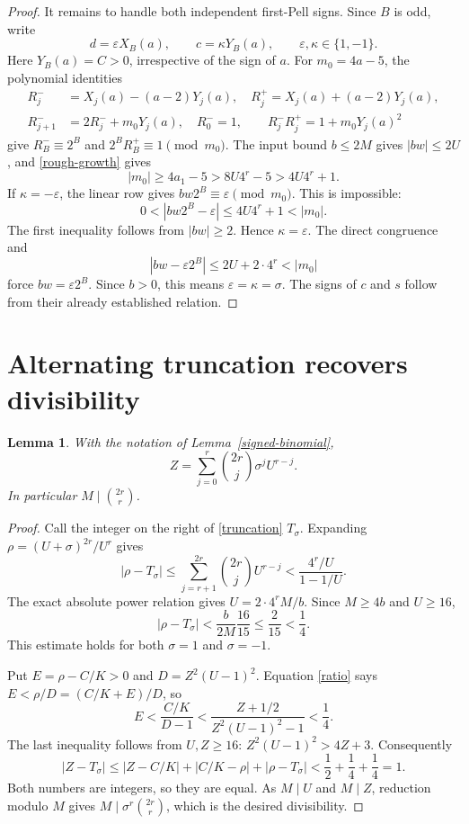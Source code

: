 \documentclass[11pt]{article}
\newtheorem{lemma}[theorem]{Lemma}
\begin{document}
\begin{proof}
It remains to handle both independent first-Pell signs. Since \(B\)
is odd, write
\[
              d=\varepsilon X_B(a),\qquad
              c=\kappa Y_B(a),\qquad
              \varepsilon,\kappa\in\{1,-1\}.
\]
Here \(Y_B(a)=C>0\), irrespective of the sign of \(a\).
For \(m_0=4a-5\), the polynomial identities
\[
 \begin{split}
 R_j^-&=X_j(a)-(a-2)Y_j(a),\quad
 R_j^+=X_j(a)+(a-2)Y_j(a),\\
 R_{j+1}^-&=2R_j^-+m_0Y_j(a),\quad R_0^-=1,\qquad
 R_j^-R_j^+=1+m_0Y_j(a)^2
 \end{split}
\]
give \(R_B^-\equiv2^B\) and \(2^BR_B^+\equiv1\pmod{m_0}\).
The input bound \(b\le2M\) gives \(|bw|\le2U\), and
\eqref{rough-growth} gives
\begin{equation}\label{m0-bound}
 |m_0|\ge4a_1-5>8U4^r-5>4U4^r+1.
\end{equation}
If \(\kappa=-\varepsilon\), the linear row gives
\(bw2^B\equiv\varepsilon\pmod{m_0}\). This is impossible:
\[
 0<|bw2^B-\varepsilon|\le4U4^r+1<|m_0|.
\]
The first inequality follows from \(|bw|\ge2\).
Hence \(\kappa=\varepsilon\). The direct congruence and
\[
 |bw-\varepsilon2^B|\le2U+2\cdot4^r<|m_0|
\]
force \(bw=\varepsilon2^B\). Since \(b>0\), this means
\(\varepsilon=\kappa=\sigma\). The signs of \(c\) and \(s\)
follow from their already established relation.
\end{proof}

\section{Alternating truncation recovers divisibility}

\begin{lemma}\label{rounding}
With the notation of Lemma~\ref{signed-binomial},
\begin{equation}\label{truncation}
 Z=\sum_{j=0}^r\binom{2r}{j}\sigma^jU^{r-j}.
\end{equation}
In particular \(M\mid\binom{2r}{r}\).
\end{lemma}
\begin{proof}
Call the integer on the right of \eqref{truncation} \(T_\sigma\).
Expanding \(\rho=(U+\sigma)^{2r}/U^r\) gives
\[
 |\rho-T_\sigma|
 \le\sum_{j=r+1}^{2r}\binom{2r}{j}U^{r-j}
 <\frac{4^r/U}{1-1/U}.
\]
The exact absolute power relation gives
\(U=2\cdot4^rM/b\). Since \(M\ge4b\) and \(U\ge16\),
\begin{equation}\label{tail}
 |\rho-T_\sigma|<\frac{b}{2M}\frac{16}{15}
 \le\frac{2}{15}<\frac14.
\end{equation}
This estimate holds for both \(\sigma=1\) and \(\sigma=-1\).

Put \(E=\rho-C/K>0\) and \(D=Z^2(U-1)^2\). Equation
\eqref{ratio} says \(E<\rho/D=(C/K+E)/D\), so
\[
 E<\frac{C/K}{D-1}<\frac{Z+1/2}{Z^2(U-1)^2-1}<\frac14.
\]
The last inequality follows from \(U,Z\ge16\):
\(Z^2(U-1)^2>4Z+3\). Consequently
\[
 |Z-T_\sigma|
 \le|Z-C/K|+|C/K-\rho|+|\rho-T_\sigma|
 <\frac12+\frac14+\frac14=1.
\]
Both numbers are integers, so they are equal. As \(M\mid U\)
and \(M\mid Z\), reduction modulo \(M\) gives
\(M\mid\sigma^r\binom{2r}{r}\), which is the desired divisibility.
\end{proof}
\end{document}
